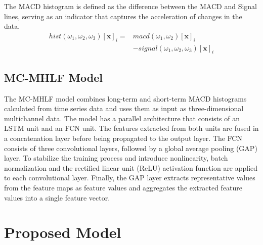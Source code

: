 \documentclass[conference]{IEEEtran}
\begin{document}
The MACD histogram is defined as the difference between the MACD and Signal lines, serving as an indicator that captures the acceleration of changes in the data.
\begin{equation}
\begin{split}
hist(\omega_1,\omega_2,\omega_3)[\mathbf{x}]_i ={}& macd(\omega_1,\omega_2)[\mathbf{x}]_i\\
& -signal(\omega_1,\omega_2,\omega_3)[\mathbf{x}]_i
\end{split}
\end{equation}

\subsection{MC-MHLF Model}

The MC-MHLF model combines long-term and short-term MACD histograms calculated from time series data and uses them as input as three-dimensional multichannel data. The model has a parallel architecture that consists of an LSTM unit and an FCN unit. The features extracted from both units are fused in a concatenation layer before being propagated to the output layer. The FCN consists of three convolutional layers, followed by a global average pooling (GAP) layer. To stabilize the training process and introduce nonlinearity, batch normalization and the rectified linear unit (ReLU) activation function are applied to each convolutional layer. Finally, the GAP layer extracts representative values from the feature maps as feature values and aggregates the extracted feature values into a single feature vector.

\section{Proposed Model}
\end{document}
